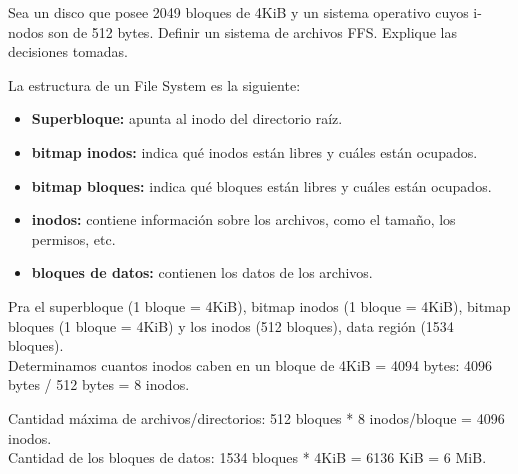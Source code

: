 \documentclass[../main.tex]{subfiles}
\begin{document}
    \begin{exercise}
        Sea un disco que posee 2049 bloques de 4KiB y un sistema operativo cuyos i-nodos son de 512 bytes. Definir un sistema de archivos FFS. Explique las decisiones tomadas.

        \begin{answer}
            La estructura de un File System es la siguiente:
            \begin{itemize}
                \item \textbf{Superbloque:} apunta al inodo del directorio raíz.
                \item \textbf{bitmap inodos:} indica qué inodos están libres y cuáles están ocupados.
                \item \textbf{bitmap bloques:} indica qué bloques están libres y cuáles están ocupados.
                \item \textbf{inodos:} contiene información sobre los archivos, como el tamaño, los permisos, etc.
                \item \textbf{bloques de datos:} contienen los datos de los archivos.
            \end{itemize}
            Pra el superbloque (1 bloque = 4KiB), bitmap inodos (1 bloque = 4KiB), bitmap bloques (1 bloque = 4KiB) y los inodos (512 bloques), data región (1534 bloques).\\

            Determinamos cuantos inodos caben en un bloque de 4KiB = 4094 bytes: 4096 bytes / 512 bytes = 8 inodos.

            Cantidad máxima de archivos/directorios: 512 bloques * 8 inodos/bloque = 4096 inodos.\\

            Cantidad de los bloques de datos: 1534 bloques * 4KiB = 6136 KiB = 6 MiB.
   
        \end{answer}
    \end{exercise}
\end{document}
